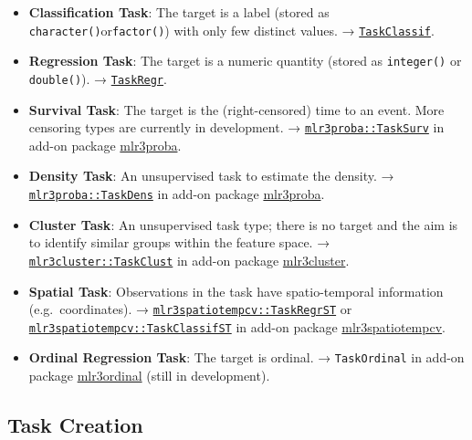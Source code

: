 \documentclass[
]{scrbook}
\begin{document}
\begin{itemize}
\item
  \textbf{Classification Task}: The target is a label (stored as \texttt{character()}or\texttt{factor()}) with only few distinct values.
  → \href{https://mlr3.mlr-org.com/reference/TaskClassif.html}{\texttt{TaskClassif}}.
\item
  \textbf{Regression Task}: The target is a numeric quantity (stored as \texttt{integer()} or \texttt{double()}).
  → \href{https://mlr3.mlr-org.com/reference/TaskRegr.html}{\texttt{TaskRegr}}.
\item
  \textbf{Survival Task}: The target is the (right-censored) time to an event. More censoring types are currently in development.
  → \href{https://mlr3proba.mlr-org.com/reference/TaskSurv.html}{\texttt{mlr3proba::TaskSurv}} in add-on package \href{https://mlr3proba.mlr-org.com}{mlr3proba}.
\item
  \textbf{Density Task}: An unsupervised task to estimate the density.
  → \href{https://mlr3proba.mlr-org.com/reference/TaskDens.html}{\texttt{mlr3proba::TaskDens}} in add-on package \href{https://mlr3proba.mlr-org.com}{mlr3proba}.
\item
  \textbf{Cluster Task}: An unsupervised task type; there is no target and the aim is to identify similar groups within the feature space.
  → \href{https://mlr3cluster.mlr-org.com/reference/TaskClust.html}{\texttt{mlr3cluster::TaskClust}} in add-on package \href{https://mlr3cluster.mlr-org.com}{mlr3cluster}.
\item
  \textbf{Spatial Task}: Observations in the task have spatio-temporal information (e.g.~coordinates).
  → \href{https://www.rdocumentation.org/packages/mlr3spatiotempcv/topics/TaskRegrST}{\texttt{mlr3spatiotempcv::TaskRegrST}} or \href{https://www.rdocumentation.org/packages/mlr3spatiotempcv/topics/TaskClassifST}{\texttt{mlr3spatiotempcv::TaskClassifST}} in add-on package \href{https://mlr3spatiotempcv.mlr-org.com}{mlr3spatiotempcv}.
\item
  \textbf{Ordinal Regression Task}: The target is ordinal.
  → \texttt{TaskOrdinal} in add-on package \href{https://github.com/mlr-org/mlr3ordinal}{mlr3ordinal} (still in development).
\end{itemize}

\hypertarget{tasks-creation}{%
\subsection{Task Creation}\label{tasks-creation}}
\end{document}
